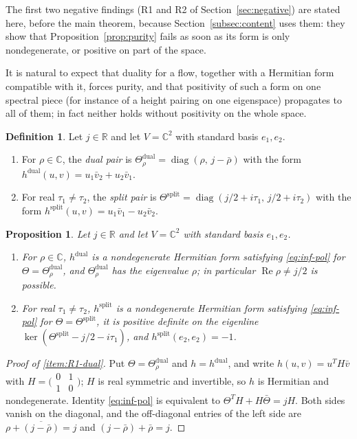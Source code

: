 \documentclass[11pt]{amsart}
\theoremstyle{plain}
\newtheorem{proposition}[theorem]{Proposition}
\theoremstyle{definition}
\newtheorem{definition}[theorem]{Definition}
\theoremstyle{remark}
\numberwithin{equation}{section}
\newcommand{\C}{\mathbb{C}}
\newcommand{\R}{\mathbb{R}}
\DeclareMathOperator{\Rea}{Re}
\DeclareMathOperator{\diag}{diag}
\renewcommand{\Re}{\Rea}
\begin{document}
The first two negative findings (R1 and R2 of
Section~\ref{sec:negative}) are stated here, before the main theorem,
because Section~\ref{subsec:content} uses them: they show that
Proposition~\ref{prop:purity} fails as soon as its form is only
nondegenerate, or positive on part of the space.

It is natural to expect that duality for a flow, together with a
Hermitian form compatible with it, forces purity, and that positivity of
such a form on one spectral piece (for instance of a height pairing on
one eigenspace) propagates to all of them; in fact neither holds without
positivity on the whole space.

\begin{definition}\label{def:R1-forms}
Let $j\in\R$ and let $V=\C^2$ with standard basis $e_1,e_2$.
\begin{enumerate}[label=(\alph*)]
\item For $\rho\in\C$, the \emph{dual pair} is
  $\Theta^{\mathrm{dual}}_\rho=\diag(\rho,\,j-\bar\rho)$ with the
  form $h^{\mathrm{dual}}(u,v)=u_1\bar v_2+u_2\bar v_1$.
\item For real $\tau_1\ne\tau_2$, the \emph{split pair} is
  $\Theta^{\mathrm{split}}=\diag(j/2+i\tau_1,\,j/2+i\tau_2)$ with the
  form $h^{\mathrm{split}}(u,v)=u_1\bar v_1-u_2\bar v_2$.
\end{enumerate}
\end{definition}

\begin{proposition}\label{prop:R1}
Let $j\in\R$ and let $V=\C^2$ with standard basis $e_1,e_2$.
\begin{enumerate}[label=(\roman*)]
\item\label{item:R1-dual} For $\rho\in\C$, $h^{\mathrm{dual}}$ is a
  nondegenerate Hermitian form satisfying \eqref{eq:inf-pol} for
  $\Theta=\Theta^{\mathrm{dual}}_\rho$, and
  $\Theta^{\mathrm{dual}}_\rho$ has the eigenvalue $\rho$; in
  particular $\Re\rho\ne j/2$ is possible.
\item\label{item:R1-partial} For real $\tau_1\ne\tau_2$,
  $h^{\mathrm{split}}$ is a nondegenerate Hermitian form satisfying
  \eqref{eq:inf-pol} for $\Theta=\Theta^{\mathrm{split}}$, it is
  positive definite on the eigenline
  $\ker(\Theta^{\mathrm{split}}-j/2-i\tau_1)$, and
  $h^{\mathrm{split}}(e_2,e_2)=-1$.
\end{enumerate}
\end{proposition}

\begin{proof}[Proof of \ref{item:R1-dual}]
Put $\Theta=\Theta^{\mathrm{dual}}_\rho$ and $h=h^{\mathrm{dual}}$, and
write $h(u,v)=u^{T}H\bar v$ with $H=\bigl(\begin{smallmatrix}0&1\\1&0
\end{smallmatrix}\bigr)$; $H$ is real symmetric and invertible, so $h$
is Hermitian and nondegenerate. Identity \eqref{eq:inf-pol} is
equivalent to $\Theta^TH+H\bar\Theta=jH$. Both sides vanish on the
diagonal, and the off-diagonal entries of the left side are
$\rho+\overline{(j-\bar\rho)}=j$ and $(j-\bar\rho)+\bar\rho=j$.
\end{proof}
\end{document}
